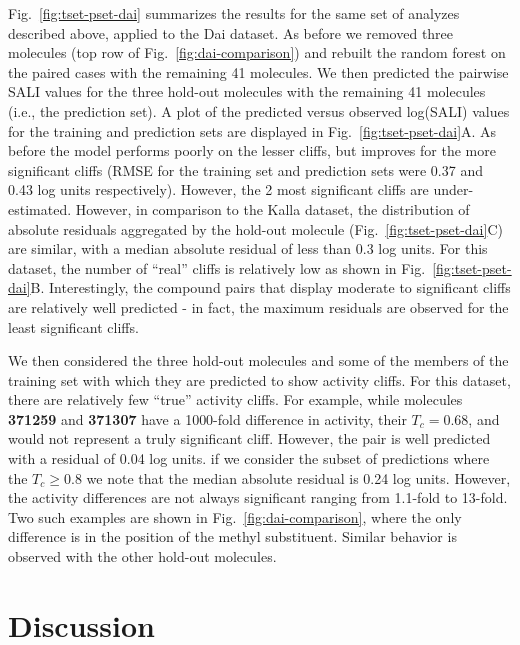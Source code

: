 \documentclass[letterpaper, 12pt]{article}
\begin{document}
Fig.~\ref{fig:tset-pset-dai} summarizes the results for the same set of analyzes described above,
applied to the Dai dataset. As before we removed three molecules (top row of
Fig.~\ref{fig:dai-comparison}) and rebuilt the random forest on the paired cases with the remaining
41 molecules. We then predicted the pairwise SALI values for the three hold-out molecules with the
remaining 41 molecules (i.e., the prediction set). A plot of the predicted versus observed log(SALI)
values for the training and prediction sets are displayed in Fig.~\ref{fig:tset-pset-dai}A. As
before the model performs poorly on the lesser cliffs, but improves for the more significant cliffs
(RMSE for the training set and prediction sets were 0.37 and 0.43 log units respectively). However,
the 2 most significant cliffs are under-estimated. However, in comparison to the Kalla dataset, the
distribution of absolute residuals aggregated by the hold-out molecule
(Fig.~\ref{fig:tset-pset-dai}C) are similar, with a median absolute residual of less than
0.3 log units.  For this dataset, the number of ``real'' cliffs is relatively low as shown in
Fig.~\ref{fig:tset-pset-dai}B. Interestingly, the compound pairs that display moderate to
significant cliffs are relatively well predicted - in fact, the maximum residuals are observed for
the least significant cliffs.

We then considered the three hold-out molecules and some of the members of the training set with
which they are predicted to show activity cliffs. For this dataset, there are relatively few
``true'' activity cliffs. For example, while molecules \textbf{371259} and \textbf{371307} have a
1000-fold difference in activity, their $T_c = 0.68$, and would not represent a truly significant
cliff. However, the pair is well predicted with a residual of 0.04 log units. if we consider the
subset of predictions where the $T_c \geq 0.8$ we note that the median absolute residual is 0.24 log
units. However, the activity differences are not always significant ranging from 1.1-fold to
13-fold. Two such examples are shown in Fig.~\ref{fig:dai-comparison}, where the only difference is
in the position of the methyl substituent. Similar behavior is observed with the other hold-out
molecules.

\section{Discussion}
\label{sec:discussion}
\end{document}
